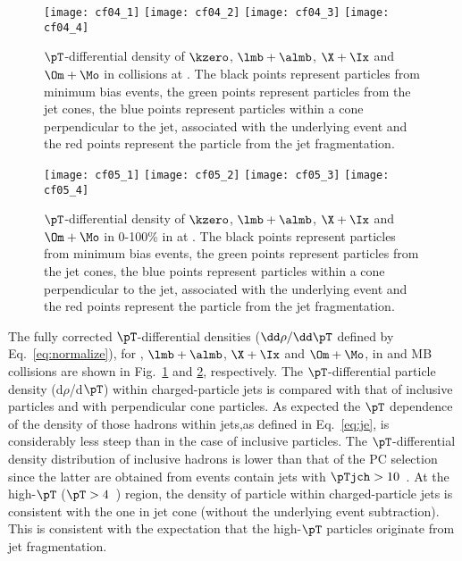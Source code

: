 \documentclass[ALICE,manyauthors]{cernphprep}
\begin{document}
\begin{figure}[!ht]
	\begin{center}
		\texttt{[image: cf04\_1]}
		\texttt{[image: cf04\_2]}
		\texttt{[image: cf04\_3]}
		\texttt{[image: cf04\_4]}
	\end{center}
	\caption{$\pT$-differential density of $\kzero$, $\lmb + \almb$, $\X + \Ix$ and $\Om + \Mo$ in \pp collisions at \thirteen. The black points represent particles from minimum bias events, the green points represent particles from the jet cones, the blue points represent particles within a cone perpendicular to the jet, associated with the underlying event and the red points represent the particle from the jet fragmentation.}
	\label{fig:ppSpect}
\end{figure}
\begin{figure}[!ht]
	\begin{center}
		\texttt{[image: cf05\_1]}
		\texttt{[image: cf05\_2]}
		\texttt{[image: cf05\_3]}
		\texttt{[image: cf05\_4]}
	\end{center}
	\caption{$\pT$-differential density of $\kzero$, $\lmb + \almb$, $\X + \Ix$ and $\Om + \Mo$ in 0-100\% in \pPb at \fivenn. The black points represent particles from minimum bias events, the green points represent particles from the jet cones, the blue points represent particles within a cone perpendicular to the jet, associated with the underlying event and the red points represent the particle from the jet fragmentation.}
	\label{fig:pPbSpect}
\end{figure}

The fully corrected $\pT$-differential densities ($\dd \rho/ \dd \pT$ defined by Eq.~\ref{eq:normalize}), for \kzero, $\lmb + \almb$, $\X + \Ix$ and $\Om + \Mo$, in \pp and MB \pPb collisions are shown in Fig.~\ref{fig:ppSpect} and \ref{fig:pPbSpect}, respectively.
The $\pT$-differential particle density (d$\rho$/d$\pT$) within charged-particle jets is compared with that of inclusive particles and with perpendicular cone particles.
As expected the $\pT$ dependence of the density of those hadrons within jets,as defined in Eq.~\ref{eq:je}, is considerably less steep than in the case of inclusive particles.
The $\pT$-differential density distribution of inclusive hadrons is lower than that of the PC selection since the latter are obtained from events contain jets with $\pTjch > 10$~\GeVc.
At the high-$\pT$ ($\pT > 4$~\GeVc) region, the density of particle within charged-particle jets is consistent with the one in jet cone (without the underlying event subtraction).
This is consistent with the expectation that the high-$\pT$ particles originate from jet fragmentation. 
\end{document}
